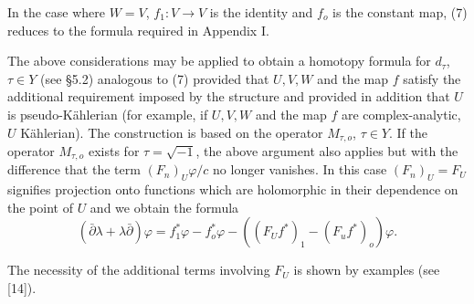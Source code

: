 In the case where $W=V$, $f_1:V\longrightarrow V$ is the identity and $f_o$ is the constant map, (7) reduces to the formula required in Appendix I.

The above considerations may be applied to obtain a homotopy formula for $d_\tau$, $\tau\in Y$ (see §5.2) analogous to (7) provided that $U,V,W$ and the map $f$ satisfy the additional requirement imposed by the structure and provided in addition that $U$ is pseudo-Kählerian (for example, if $U,V,W$ and the map $f$ are complex-analytic, $U$ Kählerian). The construction is based on the operator $M_{\tau,o}$, $\tau\in Y$. If the operator $M_{\tau,o}$ exists for $\tau=\sqrt{-1}$, the above argument also applies but with the difference that the term $(F_n)_U\varphi/c$ no longer vanishes. In this case $(F_n)_U=F_U$ signifies projection onto functions which are holomorphic in their dependence on the point of $U$ and we obtain the formula
\[
(\bar\partial\lambda+\lambda\bar\partial)\varphi
=f_1^*\varphi-f_o^*\varphi-((F_Uf^*)_1-(F_uf^*)_o)\varphi.
\]

The necessity of the additional terms involving $F_U$ is shown by examples (see [14]).

